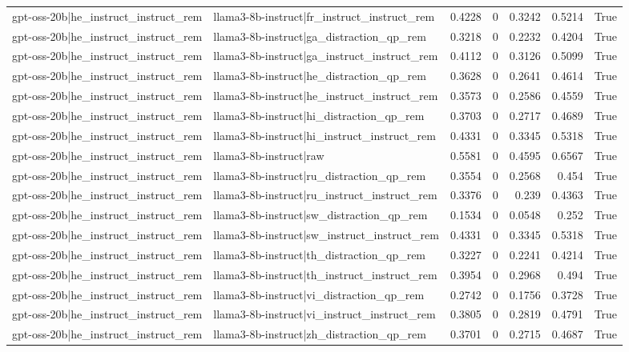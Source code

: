 \begin{table}
\begin{tabular}{l l r r r r l}
gpt-oss-20b|he_instruct_instruct_rem & llama3-8b-instruct|fr_instruct_instruct_rem & 0.4228 & 0 & 0.3242 & 0.5214 & True \\
gpt-oss-20b|he_instruct_instruct_rem & llama3-8b-instruct|ga_distraction_qp_rem & 0.3218 & 0 & 0.2232 & 0.4204 & True \\
gpt-oss-20b|he_instruct_instruct_rem & llama3-8b-instruct|ga_instruct_instruct_rem & 0.4112 & 0 & 0.3126 & 0.5099 & True \\
gpt-oss-20b|he_instruct_instruct_rem & llama3-8b-instruct|he_distraction_qp_rem & 0.3628 & 0 & 0.2641 & 0.4614 & True \\
gpt-oss-20b|he_instruct_instruct_rem & llama3-8b-instruct|he_instruct_instruct_rem & 0.3573 & 0 & 0.2586 & 0.4559 & True \\
gpt-oss-20b|he_instruct_instruct_rem & llama3-8b-instruct|hi_distraction_qp_rem & 0.3703 & 0 & 0.2717 & 0.4689 & True \\
gpt-oss-20b|he_instruct_instruct_rem & llama3-8b-instruct|hi_instruct_instruct_rem & 0.4331 & 0 & 0.3345 & 0.5318 & True \\
gpt-oss-20b|he_instruct_instruct_rem & llama3-8b-instruct|raw & 0.5581 & 0 & 0.4595 & 0.6567 & True \\
gpt-oss-20b|he_instruct_instruct_rem & llama3-8b-instruct|ru_distraction_qp_rem & 0.3554 & 0 & 0.2568 & 0.454 & True \\
gpt-oss-20b|he_instruct_instruct_rem & llama3-8b-instruct|ru_instruct_instruct_rem & 0.3376 & 0 & 0.239 & 0.4363 & True \\
gpt-oss-20b|he_instruct_instruct_rem & llama3-8b-instruct|sw_distraction_qp_rem & 0.1534 & 0 & 0.0548 & 0.252 & True \\
gpt-oss-20b|he_instruct_instruct_rem & llama3-8b-instruct|sw_instruct_instruct_rem & 0.4331 & 0 & 0.3345 & 0.5318 & True \\
gpt-oss-20b|he_instruct_instruct_rem & llama3-8b-instruct|th_distraction_qp_rem & 0.3227 & 0 & 0.2241 & 0.4214 & True \\
gpt-oss-20b|he_instruct_instruct_rem & llama3-8b-instruct|th_instruct_instruct_rem & 0.3954 & 0 & 0.2968 & 0.494 & True \\
gpt-oss-20b|he_instruct_instruct_rem & llama3-8b-instruct|vi_distraction_qp_rem & 0.2742 & 0 & 0.1756 & 0.3728 & True \\
gpt-oss-20b|he_instruct_instruct_rem & llama3-8b-instruct|vi_instruct_instruct_rem & 0.3805 & 0 & 0.2819 & 0.4791 & True \\
gpt-oss-20b|he_instruct_instruct_rem & llama3-8b-instruct|zh_distraction_qp_rem & 0.3701 & 0 & 0.2715 & 0.4687 & True \\

\end{tabular}
\end{table}
